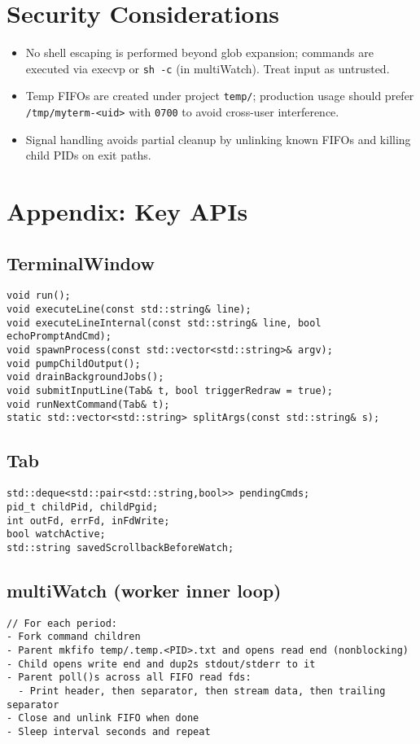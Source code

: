 \documentclass[11pt,a4paper]{article}
\begin{document}
\section{Security Considerations}
\begin{itemize}[leftmargin=*]
  \item No shell escaping is performed beyond glob expansion; commands are executed via execvp or \texttt{sh -c} (in multiWatch). Treat input as untrusted.
  \item Temp FIFOs are created under project \texttt{temp/}; production usage should prefer \texttt{/tmp/myterm-<uid>} with \texttt{0700} to avoid cross-user interference.
  \item Signal handling avoids partial cleanup by unlinking known FIFOs and killing child PIDs on exit paths.
\end{itemize}

\section{Appendix: Key APIs}
\subsection{TerminalWindow}
\begin{lstlisting}[style=code]
void run();
void executeLine(const std::string& line);
void executeLineInternal(const std::string& line, bool echoPromptAndCmd);
void spawnProcess(const std::vector<std::string>& argv);
void pumpChildOutput();
void drainBackgroundJobs();
void submitInputLine(Tab& t, bool triggerRedraw = true);
void runNextCommand(Tab& t);
static std::vector<std::string> splitArgs(const std::string& s);
\end{lstlisting}

\subsection{Tab}
\begin{lstlisting}[style=code]
std::deque<std::pair<std::string,bool>> pendingCmds;
pid_t childPid, childPgid;
int outFd, errFd, inFdWrite;
bool watchActive;
std::string savedScrollbackBeforeWatch;
\end{lstlisting}

\subsection{multiWatch (worker inner loop)}
\begin{lstlisting}[style=code]
// For each period:
- Fork command children
- Parent mkfifo temp/.temp.<PID>.txt and opens read end (nonblocking)
- Child opens write end and dup2s stdout/stderr to it
- Parent poll()s across all FIFO read fds:
  - Print header, then separator, then stream data, then trailing separator
- Close and unlink FIFO when done
- Sleep interval seconds and repeat
\end{lstlisting}
\end{document}
